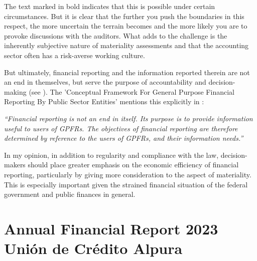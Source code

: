 \documentclass[10pt]{article}
\begin{document}
The text marked in bold indicates that this is possible under certain circumstances. But it is clear that the further you push the boundaries in this respect, the more uncertain the terrain becomes and the more likely you are to provoke discussions with the auditors. What adds to the challenge is the inherently subjective nature of materiality assessments and that the accounting sector often has a risk-averse working culture.

But ultimately, financial reporting and the information reported therein are not an end in themselves, but serve the purpose of accountability and decision-making (see \cite[Article 2.1, p.~12]{IPSASFW}). The 'Conceptual Framework For General Purpose Financial Reporting By Public Sector Entities' mentions this explicitly in \cite[Article 2.2, p.~12]{IPSASFW}:

\textit{“{}Financial reporting is not an end in itself. Its purpose is to provide information useful to users of GPFRs. The objectives of financial reporting are therefore determined by reference to the users of GPFRs, and their information needs.”{}}

In my opinion, in addition to regularity and compliance with the law, decision-makers should place greater emphasis on the economic efficiency of financial reporting, particularly by giving more consideration to the aspect of materiality. This is especially important given the strained financial situation of the federal government and public finances in general.

\newpage
\renewcommand{\refname}{References}
\printbibliography
\appendix 
\newpage
\section{Annual Financial Report 2023 Unión de Crédito Alpura}\label{sec:annual_financial_report_2023_union_de_credito_alpura}

\end{document}
